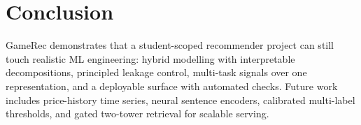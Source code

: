 \section{Conclusion}
GameRec demonstrates that a student-scoped recommender project can still touch realistic ML engineering: hybrid modelling with interpretable decompositions, principled leakage control, multi-task signals over one representation, and a deployable surface with automated checks. Future work includes price-history time series, neural sentence encoders, calibrated multi-label thresholds, and gated two-tower retrieval for scalable serving.
